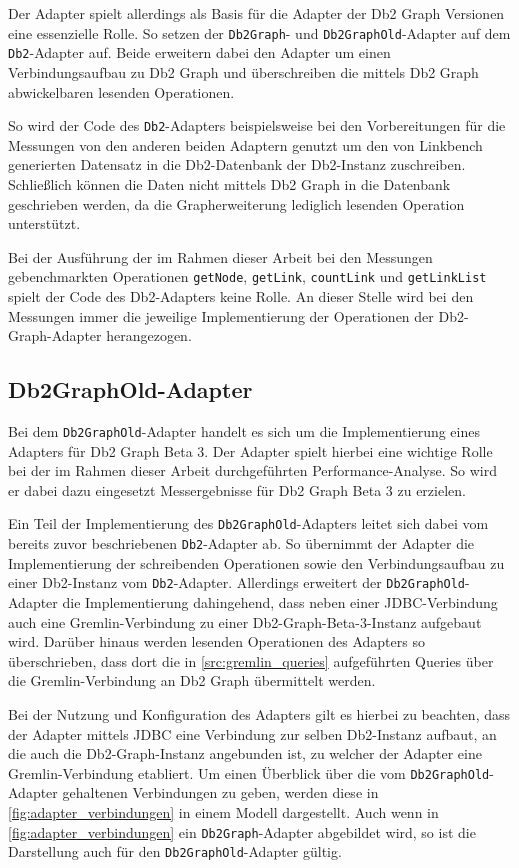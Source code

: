 Der Adapter spielt allerdings als Basis für die Adapter der Db2 Graph Versionen eine essenzielle Rolle. So setzen der \texttt{Db2Graph}- und \texttt{Db2GraphOld}-Adapter auf dem \texttt{Db2}-Adapter auf. Beide erweitern dabei den Adapter um einen Verbindungsaufbau zu Db2 Graph und überschreiben die mittels Db2 Graph abwickelbaren lesenden Operationen.

So wird der Code des \texttt{Db2}-Adapters beispielsweise bei den Vorbereitungen für die Messungen von den anderen beiden Adaptern genutzt um den von Linkbench generierten Datensatz in die Db2-Datenbank der Db2-Instanz zuschreiben. Schließlich können die Daten nicht mittels Db2 Graph in die Datenbank geschrieben werden, da die Grapherweiterung lediglich lesenden Operation unterstützt.

Bei der Ausführung der im Rahmen dieser Arbeit bei den Messungen gebenchmarkten Operationen \texttt{getNode}, \texttt{getLink}, \texttt{countLink} und \texttt{getLinkList} spielt der Code des Db2-Adapters keine Rolle. An dieser Stelle wird bei den Messungen immer die jeweilige Implementierung der Operationen der Db2-Graph-Adapter herangezogen.

\subsection{Db2GraphOld-Adapter}
\label{implementierung:adapter:db2graph:old}
Bei dem \texttt{Db2GraphOld}-Adapter handelt es sich um die Implementierung eines Adapters für Db2 Graph Beta 3. Der Adapter spielt hierbei eine wichtige Rolle bei der im Rahmen dieser Arbeit durchgeführten Performance-Analyse. So wird er dabei dazu eingesetzt Messergebnisse für Db2 Graph Beta 3 zu erzielen. 

Ein Teil der Implementierung des \texttt{Db2GraphOld}-Adapters leitet sich dabei vom bereits zuvor beschriebenen \texttt{Db2}-Adapter ab. So übernimmt der Adapter die Implementierung der schreibenden Operationen sowie den Verbindungsaufbau zu einer Db2-Instanz vom \texttt{Db2}-Adapter. Allerdings erweitert der \texttt{Db2GraphOld}-Adapter die Implementierung dahingehend, dass neben einer JDBC-Verbindung auch eine Gremlin-Verbindung zu einer Db2-Graph-Beta-3-Instanz aufgebaut wird. Darüber hinaus werden lesenden Operationen des Adapters so überschrieben, dass dort die in \autoref{src:gremlin_queries} aufgeführten Queries über die Gremlin-Verbindung an Db2 Graph übermittelt werden. 

Bei der Nutzung und Konfiguration des Adapters gilt es hierbei zu beachten, dass der Adapter mittels JDBC eine Verbindung zur selben Db2-Instanz aufbaut, an die auch die Db2-Graph-Instanz angebunden ist, zu welcher der Adapter eine Gremlin-Verbindung etabliert. Um einen Überblick über die vom \texttt{Db2GraphOld}-Adapter gehaltenen Verbindungen zu geben, werden diese in \autoref{fig:adapter_verbindungen} in einem Modell dargestellt. Auch wenn in \autoref{fig:adapter_verbindungen} ein \texttt{Db2Graph}-Adapter abgebildet wird, so ist die Darstellung auch für den \texttt{Db2GraphOld}-Adapter gültig.


